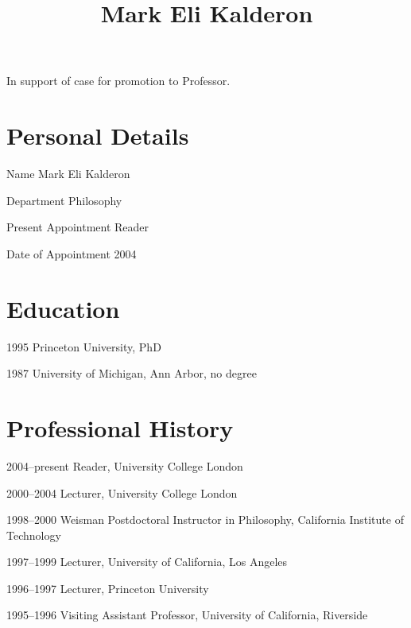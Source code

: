 \documentclass[contbibnum]{cv}
\newcommand\ucl{University College London}
\begin{document}
\title{Mark Eli Kalderon}

\maketitle

In support of case for promotion to Professor.

\section{Personal Details} %
\label{sec:personal_details}
\begin{topic}
	\item[Name] Mark Eli Kalderon
	\item[Department] Philosophy
	\item[Present Appointment] Reader
	\item[Date of Appointment] 2004
\end{topic}

\section{Education}\label{sec:education} %
\begin{topic}
	\item[1995] Princeton University, PhD
	\item[1987] University of Michigan, Ann Arbor, no degree
\end{topic}

\section{Professional History} %
\label{sec:professional_history}
\begin{topic}
	\item[2004--present] Reader, \ucl
	\item[2000--2004] Lecturer, \ucl
	\item[1998--2000] Weisman Postdoctoral Instructor in Philosophy, California Institute of Technology
	\item[1997--1999] Lecturer, University of California, Los Angeles
	\item[1996--1997] Lecturer, Princeton University
	\item[1995--1996] Visiting Assistant Professor, University of California, Riverside
\end{topic}
\end{document}
